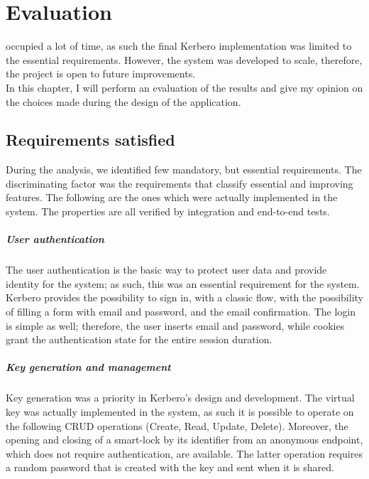 \chapter{Evaluation}
\label{cap:five}
 occupied a lot of time, as such the final Kerbero implementation was limited to the essential requirements. However, the system was developed to scale, therefore, the project is open to future improvements. 
\\ In this chapter, I will perform an evaluation of the results and give my opinion on the choices made during the design of the application.

\section{Requirements satisfied}
During the analysis, we identified few mandatory, but essential requirements. The discriminating factor was the requirements that classify essential and improving features. The following are the ones which were actually implemented in the system. The properties are all verified by integration and end-to-end tests.

\paragraph{User authentication}
The user authentication is the basic way to protect user data and provide identity for the system; as such, this was an essential requirement for the system. Kerbero provides the possibility to sign in, with a classic flow, with the possibility of filling a form with email and password, and the email confirmation. The login is simple as well; therefore, the user inserts email and password, while cookies grant the authentication state for the entire session duration.

\paragraph{Key generation and management}
Key generation was a priority in Kerbero's design and development. The virtual key was actually implemented in the system, as such it is possible to operate on the following CRUD operations (Create, Read, Update, Delete). Moreover, the opening and closing of a smart-lock by its identifier from an anonymous endpoint, which does not require authentication, are available. The latter operation requires a random password that is created with the key and sent when it is shared.

